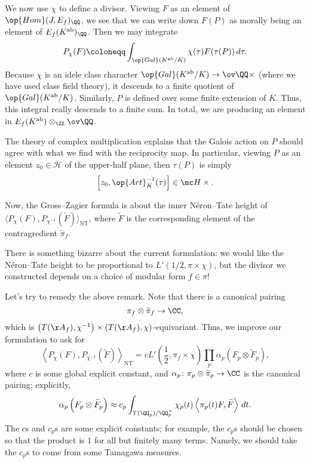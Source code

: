 \documentclass[../notes.tex]{subfiles}
\begin{document}
We now use $\chi$ to define a divisor. Viewing $F$ as an element of $\op{Hom}(J,E_f)_\QQ$, we see that we can write down $F(P)$ as morally being an element of $E_f(K^{\mathrm{ab}})_\QQ$. Then we may integrate
\[P_\chi(F)\coloneqq\int_{\op{Gal}(K^{\mathrm{ab}}/K)}\chi(\tau)F(\tau(P))\,d\tau.\]
Because $\chi$ is an idele class character $\op{Gal}(K^{\mathrm{ab}}/K)\to\ov\QQ\times$ (where we have used class field theory), it descends to a finite quotient of $\op{Gal}(K^{\mathrm{ab}}/K)$. Similarly, $P$ is defined over some finite extension of $K$. Thus, this integral really descends to a finite sum. In total, we are producing an element in $E_f(K^{\mathrm{ab}})\otimes_\ZZ\ov\QQ$.
\begin{remark}
	The theory of complex multiplication explains that the Galois action on $P$ should agree with what we find with the reciprocity map. In particular, viewing $P$ as an element $z_0\in\mathcal H$ of the upper-half plane, then $\tau(P)$ is simply
	\[\left[z_0,\op{Art}_K^{-1}(\tau)\right]\in\mc H\times.\]
\end{remark}
Now, the Gross--Zagier formula is about the inner N\'eron--Tate height of $\langle P_\chi(F),P_{\chi^{-1}}(\widetilde F)\rangle_{\mathrm{NT}}$, where $\widetilde F$ is the corresponding element of the contragredient $\widetilde\pi_f$.
\begin{remark}
	There is something bizarre about the current formulation: we would like the N\'eron--Tate height to be proportional to $L'(1/2,\pi\times\chi)$, but the divisor we constructed depends on a choice of modular form $f\in\pi$!
\end{remark}
Let's try to remedy the above remark. Note that there is a canonical pairing
\[\pi_f\otimes\widetilde\pi_f\to\CC,\]
which is $\left(T(\AA_f),\chi^{-1}\right)\times(T(\AA_f),\chi)$-equivariant. Thus, we improve our formulation to ask for
\[\left\langle P_\chi(F),P_{\chi^{-1}}(\widetilde F)\right\rangle_{\mathrm{NT}}=cL'\left(\frac12,\pi_f\times\chi\right)\prod_p\alpha_p\left(F_p\otimes\widetilde F_p\right),\]
where $c$ is some global explicit constant, and $\alpha_p\colon\pi_p\otimes\widetilde\pi_p\to\CC$ is the canonical pairing; explicitly,
\[\alpha_p\left(F_p\otimes\widetilde F_p\right)\approx c_p\int_{T(\QQ_p)/\QQ_p^\times}\chi_p(t)\left\langle\pi_p(t)F,\widetilde F\right\rangle\,dt.\]
The $c$s and $c_p$s are some explicit constants; for example, the $c_p$s should be chosen so that the product is $1$ for all but finitely many terms. Namely, we should take the $c_p$s to come from some Tamagawa measures.
\end{document}
